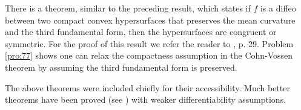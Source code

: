 \documentclass[../main]{subfiles}
\begin{document}
There is a theorem, similar to the preceding result, which states if $f$ is a diffeo between two compact convex hypersurfaces that preserves the mean curvature and the third fundamental form, then the hypersurfaces are congruent or symmetric. For the proof of this result we refer the reader to \cite{chern1951topics}, p. 29. Problem \ref{pro:77} shows one can relax the compactness assumption in the Cohn-Vossen theorem by assuming the third fundamental form is preserved.

The above theorems were included chiefly for their accessibility. Much better theorems have been proved (see \cite{poggorelov1956a}) with weaker differentiability assumptions.
\end{document}
